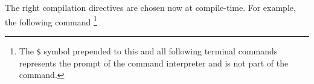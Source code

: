 The right compilation directives are chosen now at compile-time. For example, the following command
\footnote{The \texttt{\$} symbol prepended to this and all following terminal commands represents the prompt of the command interpreter and is not part of the command.}

%
%
%
%
%
%
%
%


